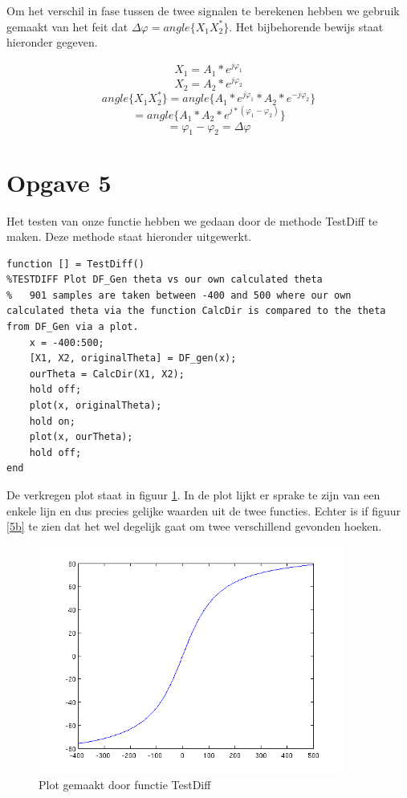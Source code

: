 \documentclass{article}
\begin{document}
Om het verschil in fase tussen de twee signalen te berekenen hebben we gebruik gemaakt van het feit dat $\Delta\varphi = angle\{X_{1}X_{2}^{*}\}$. Het bijbehorende bewijs staat hieronder gegeven.

$$X_{1} = A_{1}*e^{j\varphi_{1}}$$
$$X_{2} = A_{2}*e^{j\varphi_{2}}$$
$$angle\{X_{1}X_{2}^{*}\} = angle\{A_{1}*e^{j\varphi_{1}} * A_{2}*e^{-j\varphi_{2}}\}$$
$$= angle\{A_{1}*A_{2}*e^{j*(\varphi_{1}-\varphi_{2})}\}$$
$$= \varphi_{1}-\varphi_{2} = \Delta\varphi$$

\section{Opgave 5}

Het testen van onze functie hebben we gedaan door de methode TestDiff te maken. Deze methode staat hieronder uitgewerkt.

\begin{lstlisting}
function [] = TestDiff()
%TESTDIFF Plot DF_Gen theta vs our own calculated theta
%	901 samples are taken between -400 and 500 where our own calculated theta via the function CalcDir is compared to the theta from DF_Gen via a plot.
    x = -400:500;
    [X1, X2, originalTheta] = DF_gen(x);
    ourTheta = CalcDir(X1, X2);
    hold off;
    plot(x, originalTheta);
    hold on;
    plot(x, ourTheta);
    hold off;
end
\end{lstlisting}

De verkregen plot staat in figuur \ref{5a}. In de plot lijkt er sprake te zijn van een enkele lijn en dus precies gelijke waarden uit de twee functies. Echter is if figuur \ref{5b} te zien dat het wel degelijk gaat om twee verschillend gevonden hoeken.

\begin{figure}[h]
	\center
	\includegraphics[width = 10cm]{5a.png}
	\caption{Plot gemaakt door functie TestDiff}
 \label{5a}
\end{figure}
\end{document}

